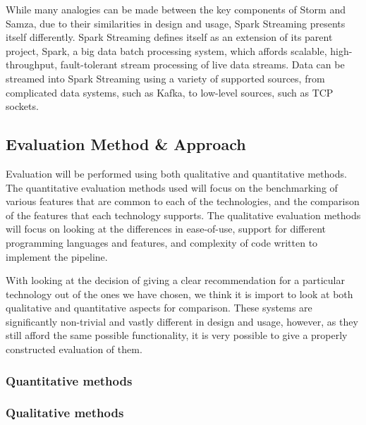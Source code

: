While many analogies can be made between the key components of Storm and Samza, due to their similarities in design and
usage, Spark Streaming presents itself differently. Spark Streaming defines itself as an extension of its parent project,
Spark, a big data batch processing system, which affords scalable, high-throughput, fault-tolerant stream processing of
live data streams. Data can be streamed into Spark Streaming using a variety of supported sources, from complicated data
systems, such as Kafka, to low-level sources, such as TCP sockets.





\subsection{Evaluation Method \& Approach} %
\label{sub:evaluation_method_approach}

Evaluation will be performed using both qualitative and quantitative methods. The quantitative evaluation methods used will focus
on the benchmarking of various features that are common to each of the technologies, and the comparison of the features that
each technology supports. The qualitative evaluation methods will focus on looking at the differences in ease-of-use,
support for different programming languages and features, and complexity of code written to implement the pipeline.

With looking at the decision of giving a clear recommendation for a particular technology out of the ones we have chosen,
we think it is import to look at both qualitative and quantitative aspects for comparison. These systems are significantly
non-trivial and vastly different in design and usage, however, as they still afford the same possible functionality,
it is very possible to give a properly constructed evaluation of them.


\subsubsection{Quantitative methods} %
\label{ssub:quantitative_methods}





\subsubsection{Qualitative methods} %
\label{ssub:qualitative_methods}

